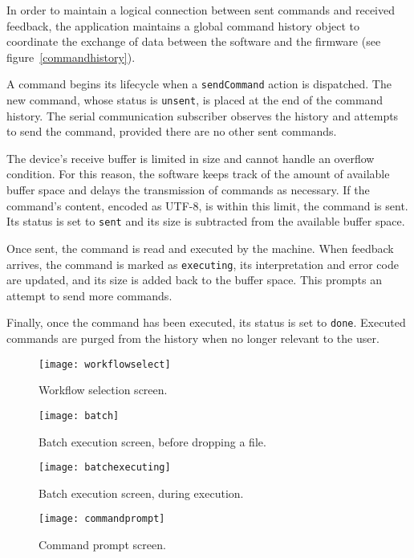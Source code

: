 In order to maintain a logical connection between sent commands and received
feedback, the application maintains a global command history object to
coordinate the exchange of data between the software and the firmware
(see figure~\ref{commandhistory}).

A command begins its lifecycle when a \texttt{sendCommand} action is dispatched.
The new command, whose status is \texttt{unsent}, is placed at the end of the
command history. The serial communication subscriber observes the history and
attempts to send the command, provided there are no other sent commands.

The device's receive buffer is limited in size and cannot handle an overflow
condition. For this reason, the software keeps track of the amount of available
buffer space and delays the transmission of commands as necessary. If the
command's content, encoded as UTF-8, is within this limit, the command is sent.
Its status is set to \texttt{sent} and its size is subtracted from the
available buffer space.

Once sent, the command is read and executed by the machine. When feedback
arrives, the command is marked as \texttt{executing}, its interpretation and
error code are updated, and its size is added back to the buffer space.
This prompts an attempt to send more commands.

Finally, once the command has been executed, its status is set to \texttt{done}.
Executed commands are purged from the history when no longer relevant to the
user.

\clearpage
\begin{figure}[ht]
    \begin{center}
        \texttt{[image: workflowselect]}
        \caption{Workflow selection screen.}
        \label{workflow}
    \end{center}
\end{figure}
\begin{figure}[ht!]
    \begin{center}
        \texttt{[image: batch]}
        \caption{Batch execution screen, before dropping a file.}
    \end{center}
\end{figure}

\clearpage
\begin{figure}[ht]
    \begin{center}
        \texttt{[image: batchexecuting]}
        \caption{Batch execution screen, during execution.}
        \label{batch}
    \end{center}
\end{figure}
\begin{figure}[ht!]
    \begin{center}
        \texttt{[image: commandprompt]}
        \caption{Command prompt screen.}
        \label{commandprompt}
    \end{center}
\end{figure}

